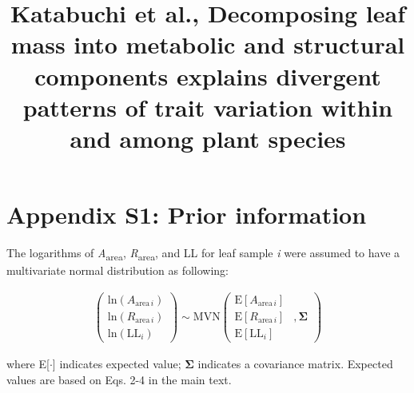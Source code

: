 \documentclass[
  12pt,
  letterpaper,
  DIV=11,
  numbers=noendperiod]{scrartcl}
\title{Katabuchi et al., Decomposing leaf mass into metabolic and
structural components explains divergent patterns of trait variation
within and among plant species}
\author{}
\date{}
\renewcommand*\contentsname{Table of contents}
\newcommand\contentsname{Table of contents}
\begin{document}
\maketitle
\ifdefined\Shaded\renewenvironment{Shaded}{\begin{tcolorbox}[boxrule=0pt, interior hidden, sharp corners, breakable, frame hidden, borderline west={3pt}{0pt}{shadecolor}, enhanced]}{\end{tcolorbox}}\fi

\renewcommand*\contentsname{Table of contents}
{
\hypersetup{linkcolor=}
\setcounter{tocdepth}{3}
\tableofcontents
}
\newpage

\hypertarget{appendix-s1-prior-information}{%
\section{Appendix S1: Prior
information}\label{appendix-s1-prior-information}}

The logarithms of \emph{A}\textsubscript{area},
\emph{R}\textsubscript{area}, and LL for leaf sample \emph{i} were
assumed to have a multivariate normal distribution as following:

\begin{align}
\left(
\begin{array}{ccc}
\mathrm{ln}(A_{\mathrm{area} \, i})\\
\mathrm{ln}(R_{\mathrm{area} \, i}) \\
\mathrm{ln}(\mathrm{LL}_i)
\end{array}
\right)
\sim \mathrm{MVN}
\left(
\begin{array}{rrr}
\mathrm{E}[A_{\mathrm{area} \, i}]\\
\mathrm{E}[R_{\mathrm{area} \, i}] &, \boldsymbol{\Sigma}\\
\mathrm{E}[\mathrm{LL}_i]
\end{array}
\right) \tag{S1}
\end{align}

where E{[}\(\cdot\){]} indicates expected value; \(\boldsymbol{\Sigma}\)
indicates a covariance matrix. Expected values are based on Eqs. 2-4 in
the main text.
\end{document}
